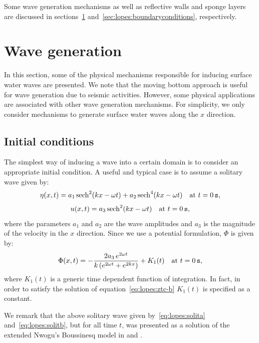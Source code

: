 Some wave generation mechanisms as well as reflective walls and sponge
layers are discussed in sections~\ref{sec:lopes:wavegeneration}
and~\ref{sec:lopes:boundaryconditions}, respectively.

\section{Wave generation}
\label{sec:lopes:wavegeneration}

In this section, some of the physical mechanisms responsible for
inducing surface water waves are presented.  We note that the moving
bottom approach is useful for wave generation due to seismic
activities. However, some physical applications are associated with
other wave generation mechanisms.  For simplicity, we only consider
mechanisms to generate surface water waves along the $x$ direction.

\subsection{Initial conditions}

The simplest way of inducing a wave into a certain domain is to
consider an appropriate initial condition. A useful and typical case
is to assume a solitary wave given by:
\begin{equation}
  \label{eq:lopes:solita}
  \eta(x,t)=a_1\,{\rm sech}^2(kx -\omega t)+a_2\,{\rm
    sech}^4(kx-\omega t)\quad {\rm at\,\,} t=0\,{\tt s},
\end{equation}
\begin{equation}
  \label{eq:lopes:solitb}
  u(x,t)=a_3\,{\rm sech}^2(k x-\omega t) \quad {\rm at\,\,}
  t=0\,{\tt s},
\end{equation}
where the parameters $a_1$ and $a_2$ are the wave amplitudes and $a_3$
is the magnitude of the velocity in the $x$ direction.  Since we use a
potential formulation, $\Phi$ is given by:
\begin{equation}
\label{eq:lopes:solitp}
\Phi(x,t)=-\frac{2a_3\,e^{2\omega t }}{k\,(e^{2\omega t }+e^{2k x})}+
K_1(t) \quad {\rm at\,\,} t=0\,{\tt s},
\end{equation}
where $K_1(t)$ is a generic time dependent function of integration.  In
fact, in order to satisfy the solution of equation~\eqref{eq:lopes:ztc-b}
$K_1(t)$ is specified as a constant.

We remark that the above solitary wave given
by~\eqref{eq:lopes:solita} and~\eqref{eq:lopes:solitb}, but for all
time $t$, was presented as a solution of the extended Nwogu's
Boussinesq model in \citet{Walkley1999} and \citet{WeiKirby1995}.

